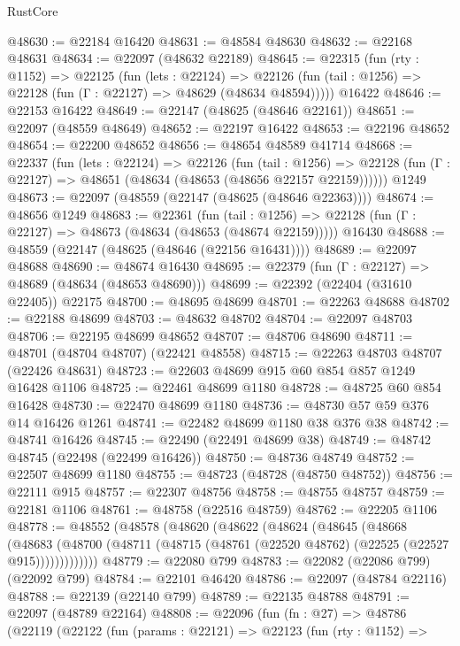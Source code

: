 \begin{lexlean}{RustCore}
\begin{coremodule}
@48630 := @22184 @16420
@48631 := @48584 @48630
@48632 := @22168 @48631
@48634 := @22097 (@48632 @22189)
@48645 := @22315
    (fun (rty : @1152) =>
    @22125
      (fun (lets : @22124) =>
      @22126 (fun (tail : @1256) => @22128 (fun (Γ : @22127) => @48629 (@48634 @48594)))))
    @16422
@48646 := @22153 @16422
@48649 := @22147 (@48625 (@48646 @22161))
@48651 := @22097 (@48559 @48649)
@48652 := @22197 @16422
@48653 := @22196 @48652
@48654 := @22200 @48652
@48656 := @48654 @48589 @41714
@48668 := @22337
    (fun (lets : @22124) =>
    @22126
      (fun (tail : @1256) =>
      @22128 (fun (Γ : @22127) => @48651 (@48634 (@48653 (@48656 @22157 @22159))))))
    @1249
@48673 := @22097 (@48559 (@22147 (@48625 (@48646 @22363))))
@48674 := @48656 @1249
@48683 := @22361
    (fun (tail : @1256) => @22128 (fun (Γ : @22127) => @48673 (@48634 (@48653 (@48674 @22159)))))
    @16430
@48688 := @48559 (@22147 (@48625 (@48646 (@22156 @16431))))
@48689 := @22097 @48688
@48690 := @48674 @16430
@48695 := @22379 (fun (Γ : @22127) => @48689 (@48634 (@48653 @48690)))
@48699 := @22392 (@22404 (@31610 @22405)) @22175
@48700 := @48695 @48699
@48701 := @22263 @48688
@48702 := @22188 @48699
@48703 := @48632 @48702
@48704 := @22097 @48703
@48706 := @22195 @48699 @48652
@48707 := @48706 @48690
@48711 := @48701 (@48704 @48707) (@22421 @48558)
@48715 := @22263 @48703 @48707 (@22426 @48631)
@48723 := @22603 @48699 @915 @60 @854 @857 @1249 @16428 @1106
@48725 := @22461 @48699 @1180
@48728 := @48725 @60 @854 @16428
@48730 := @22470 @48699 @1180
@48736 := @48730 @57 @59 @376 @14 @16426 @1261
@48741 := @22482 @48699 @1180 @38 @376 @38
@48742 := @48741 @16426
@48745 := @22490 (@22491 @48699 @38)
@48749 := @48742 @48745 (@22498 (@22499 @16426))
@48750 := @48736 @48749
@48752 := @22507 @48699 @1180
@48755 := @48723 (@48728 (@48750 @48752))
@48756 := @22111 @915
@48757 := @22307 @48756
@48758 := @48755 @48757
@48759 := @22181 @1106
@48761 := @48758 (@22516 @48759)
@48762 := @22205 @1106
@48778 := @48552
    (@48578
      (@48620
        (@48622
          (@48624
            (@48645
              (@48668
                (@48683
                  (@48700 (@48711 (@48715 (@48761 (@22520 @48762) (@22525 (@22527 @915)))))))))))))
@48779 := @22080 @799
@48783 := @22082 (@22086 @799) (@22092 @799)
@48784 := @22101 @46420
@48786 := @22097 (@48784 @22116)
@48788 := @22139 (@22140 @799)
@48789 := @22135 @48788
@48791 := @22097 (@48789 @22164)
@48808 := @22096
    (fun (fn : @27) =>
    @48786
      (@22119
        (@22122
          (fun (params : @22121) =>
          @22123
            (fun (rty : @1152) =>

\end{coremodule}
\end{lexlean}
